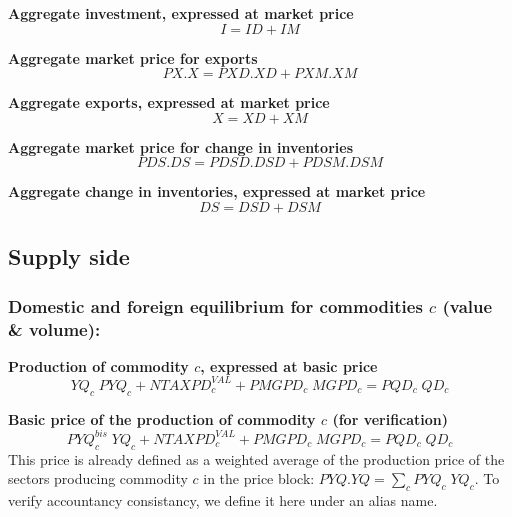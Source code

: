 \documentclass[12pt]{article}
\numberwithin{equation}{section}
\begin{document}
\noindent\textbf{Aggregate investment, expressed at market price} \\
\begin{dmath}
I = ID + IM
\end{dmath}

\noindent\textbf{Aggregate market price for exports} \\
\begin{dmath}
PX . X = PXD . XD + PXM . XM
\end{dmath}

\noindent\textbf{Aggregate exports, expressed at market price} \\
\begin{dmath}
X = XD + XM
\end{dmath}

\noindent\textbf{Aggregate market price for change in inventories} \\
\begin{dmath}
PDS . DS = PDSD . DSD + PDSM . DSM
\end{dmath}

\noindent\textbf{Aggregate change in inventories, expressed at market price} \\
\begin{dmath}
DS = DSD + DSM
\end{dmath}

\newpage


\subsection{Supply side}





\subsubsection{Domestic and foreign equilibrium for commodities $c$ (value \& volume):}




\noindent\textbf{Production of commodity $c$, expressed at basic price} \\

\begin{dmath}
YQ_{c} \; PYQ_{c} + NTAXPD^{VAL}_{c} + PMGPD_{c} \; MGPD_{c} = PQD_{c} \; QD_{c}
\end{dmath}

\noindent\textbf{Basic price of the production of commodity $c$ (for verification)} \\
\begin{dmath}
PYQ^{bis}_{c} \; YQ_{c} + NTAXPD^{VAL}_{c} + PMGPD_{c} \; MGPD_{c} = PQD_{c} \; QD_{c}
\end{dmath}
 This price is already defined as a weighted average of the production price of the sectors producing commodity $c$ in the price block: $PYQ . YQ = \sum_{c} PYQ_{c} \; YQ_{c}$. To verify accountancy consistancy, we define it here under an alias name. \\
\end{document}
